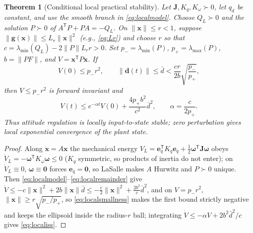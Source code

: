 \documentclass[letterpaper, 10 pt, conference]{ieeeconf}
\newtheorem{theorem}{Theorem}
\newcommand{\T}{^{\mathsf T}}
\begin{document}
\begin{theorem}[Conditional local practical stability]
\label{thm:local}
Let $\bm J,K_q,K_\omega\succ0$, let $q_d$ be constant, and use the smooth
branch in \eqref{eq:localmodel}. Choose $Q_L\succ0$ and the solution
$P\succ0$ of $A\T P+PA=-Q_L$. On $\|\bm x\|\le r<1$, suppose
$\|\bm g(\bm x)\|\le L_r\|\bm x\|^2$ (e.g., \eqref{eq:Lr}) and choose $r$ so that
$c=\lambda_{\min}(Q_L)-2\|P\|L_r r>0$.
Set $p_- =\lambda_{\min}(P)$, $p_+=\lambda_{\max}(P)$,
$b=\|PF\|$, and $V=\bm x\T P\bm x$. If
\begin{equation}
 V(0)\le p_-r^2,\qquad
 \|\bm d(t)\|\le\bar d<\frac{cr}{2b}\sqrt{\frac{p_-}{p_+}},
 \label{eq:localsmallness}
\end{equation}
then $V\le p_-r^2$ is forward invariant and
\begin{equation}
 V(t)\le e^{-\alpha t}V(0)+\frac{4p_+b^2}{c^2}\bar d^2,
 \qquad \alpha=\frac{c}{2p_+}.
 \label{eq:localiss}
\end{equation}
Thus attitude regulation is locally input-to-state stable; zero
perturbation gives local exponential convergence of the plant state.
\end{theorem}
\begin{proof}
Along $\dot{\bm x}=A\bm x$ the mechanical energy
$V_L=\bm e_q\T K_q\bm e_q+\frac12\bm\omega\T\bm J\bm\omega$ obeys
$\dot V_L=-\bm\omega\T K_\omega\bm\omega\le0$ ($K_q$ symmetric, so products
of inertia do not enter); on $\dot V_L\equiv0$, $\bm\omega\equiv\bm0$ forces
$\bm e_q=\bm0$, so LaSalle \cite{khalil2002nonlinear} makes $A$ Hurwitz and
$P\succ0$ unique. Then
\eqref{eq:localmodel}--\eqref{eq:localremainder} give
$\dot V\le-c\|\bm x\|^2+2b\|\bm x\|\bar d
\le-\frac c2\|\bm x\|^2+\frac{2b^2}{c}\bar d^2$, and on $V=p_-r^2$,
$\|\bm x\|\ge r\sqrt{p_-/p_+}$, so \eqref{eq:localsmallness} makes the first
bound strictly negative and keeps the ellipsoid inside the radius-$r$ ball;
integrating $\dot V\le-\alpha V+2b^2\bar d^2/c$ gives \eqref{eq:localiss}.
\end{proof}
\end{document}

